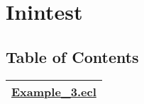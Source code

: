 \chapter*{Inintest}
\hypertarget{ecldoc:toc:Inintest}{}


\section*{Table of Contents}
{\renewcommand{\arraystretch}{1.5}
\begin{longtable}{|p{\textwidth}|}
\hline
\hyperlink{ecldoc:toc:Inintest.Example_3}{Example\_3.ecl} \\
\hline
\end{longtable}
}


